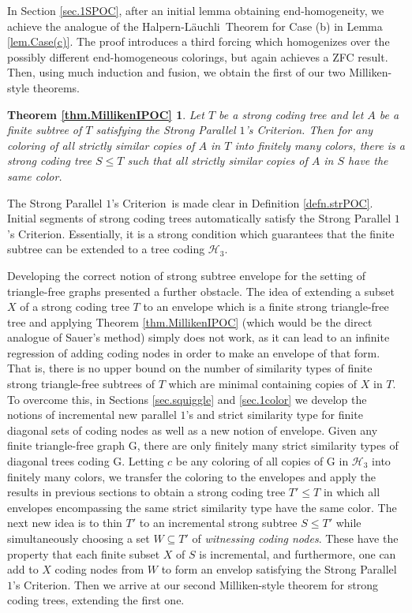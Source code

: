 \documentclass{amsart}
\newtheorem*{thmR1}{Theorem \ref{thm.MillikenIPOC}}
\theoremstyle{remark}
\theoremstyle{definition}
\theoremstyle{remark}
\newcommand{\sse}{\subseteq}
\newcommand{\G}{\mathrm{G}}
\newcommand{\STROC}{Strong Parallel $1$'s Criterion}
\newcommand{\Lauchli}{L{\"{a}}uchli}
\begin{document}
In Section \ref{sec.1SPOC},
after an initial lemma obtaining end-homogeneity,
we
achieve the analogue of the Halpern-\Lauchli\ Theorem
for Case (b) in Lemma \ref{lem.Case(c)}.
The proof
introduces a third forcing
which homogenizes over the possibly different end-homogeneous colorings, but again achieves a ZFC result.
Then, using much induction and fusion,
we obtain the first of our two Milliken-style theorems.
\begin{thmR1}
Let $T$ be a strong coding tree and let $A$ be a finite subtree of $T$ satisfying the \STROC.
Then for any coloring of all strictly similar copies of $A$ in $T$ into finitely many colors,
there is a strong coding tree $S\le T$
such that all strictly similar copies of $A$ in $S$  have the same color.
\end{thmR1}
The \STROC\ is  made clear in Definition \ref{defn.strPOC}.
Initial segments of strong coding trees automatically satisfy the \STROC.
Essentially, it is a strong condition which guarantees that the finite subtree can be extended to a tree coding $\mathcal{H}_3$.




Developing the correct notion of strong subtree envelope for the setting of triangle-free graphs  presented a further  obstacle.
The idea of extending a subset $X$ of a strong coding tree $T$  to an envelope which is a  finite strong triangle-free  tree  and applying Theorem \ref{thm.MillikenIPOC}
(which would be the direct analogue of Sauer's method)
simply does not work, as it can lead to an infinite regression of adding coding nodes in order to
 make an envelope of that form.
That is, there is no upper bound on the number of
 similarity  types  of finite strong triangle-free  subtrees of $T$
which are minimal containing
copies of $X$ in $T$.
To overcome this,
in Sections
\ref{sec.squiggle}
   and
 \ref{sec.1color}
we develop  the   notions of  incremental new parallel $1$'s and  strict similarity type for finite diagonal sets of coding nodes
as well as a new notion of  envelope.
Given any   finite triangle-free graph $\G$, there are only finitely many strict similarity types of diagonal trees coding $\G$.
Letting
$c$ be any coloring of all copies of $\G$ in $\mathcal{H}_3$ into finitely many colors,
we
transfer the coloring to the envelopes and
 apply the results in previous sections to obtain a strong coding tree $T'\le T$ in which all  envelopes  encompassing the same strict similarity type  have the same color.
The next new idea is to thin $T'$
to an incremental strong subtree $S\le T'$ while simultaneously choosing a set $W\sse T'$ of {\em witnessing coding nodes}.
These have the property that  each  finite
subset $X$ of $S$  is incremental, and furthermore, one can add to $X$ coding nodes from $W$ to form an envelop satisfying the \STROC.
Then we arrive at our second Milliken-style theorem for strong coding trees, extending the first one.
\end{document}
